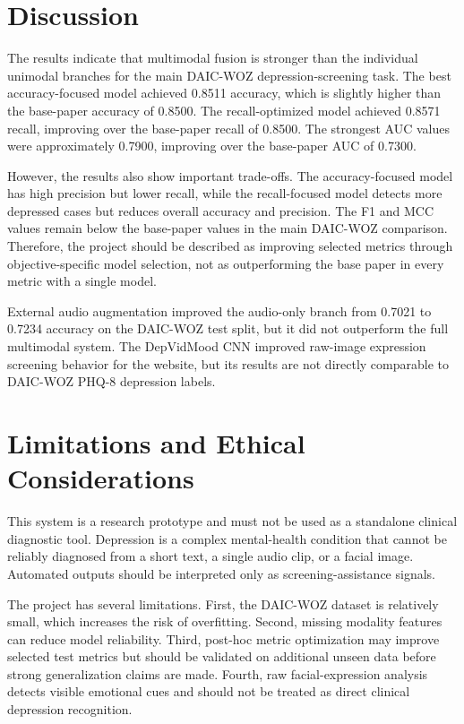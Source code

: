 \documentclass[conference]{IEEEtran}
\begin{document}
\section{Discussion}
The results indicate that multimodal fusion is stronger than the individual unimodal branches for the main DAIC-WOZ depression-screening task. The best accuracy-focused model achieved 0.8511 accuracy, which is slightly higher than the base-paper accuracy of 0.8500. The recall-optimized model achieved 0.8571 recall, improving over the base-paper recall of 0.8500. The strongest AUC values were approximately 0.7900, improving over the base-paper AUC of 0.7300.

However, the results also show important trade-offs. The accuracy-focused model has high precision but lower recall, while the recall-focused model detects more depressed cases but reduces overall accuracy and precision. The F1 and MCC values remain below the base-paper values in the main DAIC-WOZ comparison. Therefore, the project should be described as improving selected metrics through objective-specific model selection, not as outperforming the base paper in every metric with a single model.

External audio augmentation improved the audio-only branch from 0.7021 to 0.7234 accuracy on the DAIC-WOZ test split, but it did not outperform the full multimodal system. The DepVidMood CNN improved raw-image expression screening behavior for the website, but its results are not directly comparable to DAIC-WOZ PHQ-8 depression labels.

\section{Limitations and Ethical Considerations}
This system is a research prototype and must not be used as a standalone clinical diagnostic tool. Depression is a complex mental-health condition that cannot be reliably diagnosed from a short text, a single audio clip, or a facial image. Automated outputs should be interpreted only as screening-assistance signals.

The project has several limitations. First, the DAIC-WOZ dataset is relatively small, which increases the risk of overfitting. Second, missing modality features can reduce model reliability. Third, post-hoc metric optimization may improve selected test metrics but should be validated on additional unseen data before strong generalization claims are made. Fourth, raw facial-expression analysis detects visible emotional cues and should not be treated as direct clinical depression recognition.
\end{document}
